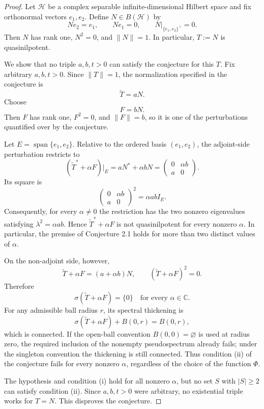 \documentclass[11pt]{article}
\newcommand{\C}{\mathbb C}
\newcommand{\cH}{\mathcal H}
\begin{document}
\begin{proof}
Let $\cH$ be a complex separable infinite-dimensional Hilbert space and fix
orthonormal vectors $e_1,e_2$. Define $N\in B(\cH)$ by
\[
 Ne_2=e_1,\qquad Ne_1=0,\qquad
 N|_{\{e_1,e_2\}^{\perp}}=0.
\]
Then $N$ has rank one, $N^2=0$, and $\|N\|=1$. In particular, $T:=N$ is
quasinilpotent.

We show that no triple $a,b,t>0$ can satisfy the conjecture for this $T$.
Fix arbitrary $a,b,t>0$. Since $\|T\|=1$, the normalization specified in
the conjecture is
\[
 \widetilde T=aN.
\]
Choose
\[
 F=bN.
\]
Then $F$ has rank one, $F^2=0$, and $\|F\|=b$, so it is one of the
perturbations quantified over by the conjecture.

Let $E=\operatorname{span}\{e_1,e_2\}$. Relative to the ordered basis
$(e_1,e_2)$, the adjoint-side perturbation restricts to
\[
 (\widetilde T^*+\alpha F)|_E
 =aN^*+\alpha bN
 =\begin{pmatrix}0&\alpha b\\ a&0\end{pmatrix}.
\]
Its square is
\[
 \begin{pmatrix}0&\alpha b\\ a&0\end{pmatrix}^{\!2}
 =\alpha ab I_E.
\]
Consequently, for every $\alpha\ne0$ the restriction has the two nonzero
eigenvalues satisfying $\lambda^2=\alpha ab$. Hence
$\widetilde T^*+\alpha F$ is not quasinilpotent for every nonzero $\alpha$.
In particular, the premise of Conjecture 2.1 holds for more than two distinct
values of $\alpha$.

On the non-adjoint side, however,
\[
 \widetilde T+\alpha F=(a+\alpha b)N,
 \qquad
 (\widetilde T+\alpha F)^2=0.
\]
Therefore
\[
 \sigma(\widetilde T+\alpha F)=\{0\}
 \quad\text{for every }\alpha\in\C.
\]
For any admissible ball radius $r$, its spectral thickening is
\[
 \sigma(\widetilde T+\alpha F)+B(0,r)=B(0,r),
\]
which is connected. If the open-ball convention $B(0,0)=\varnothing$ is
used at radius zero, the required inclusion of the nonempty pseudospectrum
already fails; under the singleton convention the thickening is still
connected. Thus condition (ii) of the conjecture fails for every nonzero
$\alpha$, regardless of the choice of the function $\Phi$.

The hypothesis and condition (i) hold for all nonzero $\alpha$, but no set
$S$ with $|S|\ge2$ can satisfy condition (ii). Since $a,b,t>0$ were
arbitrary, no existential triple works for $T=N$. This disproves the
conjecture.
\end{proof}
\end{document}
